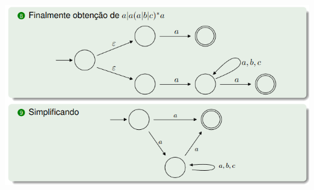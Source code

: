 \documentclass{article}
\begin{document}
\begin{flushleft}
  \begin{center}
    \includegraphics[scale=0.4]{80}
  \end{center}
\end{flushleft}
\end{document}
